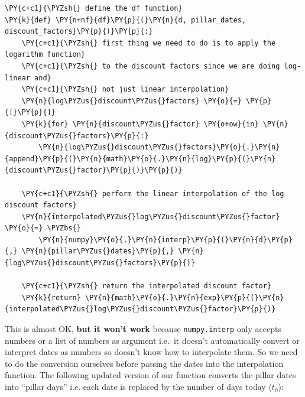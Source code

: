 \begin{tcolorbox}[breakable, size=fbox, boxrule=1pt, pad at break*=1mm,colback=cellbackground, colframe=cellborder]
\begin{Verbatim}[commandchars=\\\{\}]
\PY{c+c1}{\PYZsh{} define the df function}
\PY{k}{def} \PY{n+nf}{df}\PY{p}{(}\PY{n}{d, pillar_dates, discount_factors}\PY{p}{)}\PY{p}{:}
    \PY{c+c1}{\PYZsh{} first thing we need to do is to apply the logarithm function}
    \PY{c+c1}{\PYZsh{} to the discount factors since we are doing log-linear and}
    \PY{c+c1}{\PYZsh{} not just linear interpolation}
    \PY{n}{log\PYZus{}discount\PYZus{}factors} \PY{o}{=} \PY{p}{[}\PY{p}{]}
    \PY{k}{for} \PY{n}{discount\PYZus{}factor} \PY{o+ow}{in} \PY{n}{discount\PYZus{}factors}\PY{p}{:}
        \PY{n}{log\PYZus{}discount\PYZus{}factors}\PY{o}{.}\PY{n}{append}\PY{p}{(}\PY{n}{math}\PY{o}{.}\PY{n}{log}\PY{p}{(}\PY{n}{discount\PYZus{}factor}\PY{p}{)}\PY{p}{)}
    
    \PY{c+c1}{\PYZsh{} perform the linear interpolation of the log discount factors}
    \PY{n}{interpolated\PYZus{}log\PYZus{}discount\PYZus{}factor} \PY{o}{=} \PYZbs{}
        \PY{n}{numpy}\PY{o}{.}\PY{n}{interp}\PY{p}{(}\PY{n}{d}\PY{p}{,} \PY{n}{pillar\PYZus{}dates}\PY{p}{,} \PY{n}{log\PYZus{}discount\PYZus{}factors}\PY{p}{)}
    
    \PY{c+c1}{\PYZsh{} return the interpolated discount factor}
    \PY{k}{return} \PY{n}{math}\PY{o}{.}\PY{n}{exp}\PY{p}{(}\PY{n}{interpolated\PYZus{}log\PYZus{}discount\PYZus{}factor}\PY{p}{)}
\end{Verbatim}
\end{tcolorbox}

This is almost OK, \textbf{but it won't work} because \texttt{numpy.interp} only accepts numbers or a list of numbers as argument i.e.~it doesn't automatically convert or interpret dates as numbers so doesn't know how to interpolate them. So we need to do the conversion ourselves before passing the dates into the interpolation function.
The following updated version of our function converts the pillar dates into ``pillar days'' i.e. each date is replaced by the number of days today ($t_0$):

